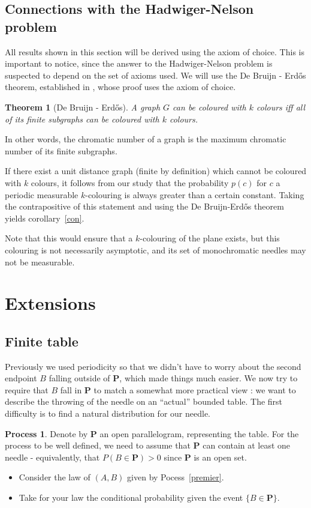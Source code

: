 \documentclass[a4paper,11pt]{article}
\newtheorem{theo}{Theorem}
\theoremstyle{definition}
\newtheorem{process}{Process}
\theoremstyle{remark}
\begin{document}
\subsection{Connections with the Hadwiger-Nelson problem} \label{hn}
All results shown in this section will be derived using the axiom of choice. 
This is important to notice, since the answer to the Hadwiger-Nelson problem is 
suspected to depend on the set of axioms used. We will use the 
De Bruijn - Erd\H{o}s theorem, established in \cite{erdos}, whose proof uses 
the axiom of choice.
\begin{theo}[De Bruijn - Erdős]
 A graph $G$ can be coloured with $k$ colours iff all of its finite subgraphs 
 can be coloured with $k$ colours.
\end{theo}
In other words, the chromatic number of a graph is the maximum chromatic number 
of its finite subgraphs.

If there exist a unit distance graph (finite by definition) which cannot 
be coloured with $k$ colours, it 
follows from our study that the probability $p(c)$ for $c$ a periodic measurable 
$k$-colouring is always greater than a certain constant. Taking the 
contrapositive of this statement and using the De Bruijn-Erdős theorem yields 
corollary~\ref{con}.

Note that this would ensure that a $k$-colouring of the plane exists, but this 
colouring is not necessarily asymptotic, and its set of monochromatic needles 
may not be measurable.

\section{Extensions}
\label{ext}
\subsection{Finite table}
\label{fini}

Previously we used periodicity so that we didn't have to worry about the second 
endpoint $B$ falling outside of $\mathbf{P}$, which made things much easier. We now 
try to require that $B$ fall in $\mathbf{P}$ to match a somewhat more practical 
view : we want to describe the throwing of the needle on an ``actual'' bounded 
table. The first difficulty is to find a natural distribution for our needle.

\begin{process} \label{encore}
Denote by $\mathbf{P}$ an open parallelogram, representing the table. For the 
process to be well defined, we need to assume that $\mathbf{P}$ can contain at
least one needle - equivalently, that $P(B \in \mathbf{P}) > 0$ since $\mathbf{P}$ 
is an open set.
\begin{itemize}
\item Consider the law of $(A,B)$ given by Pocess~\ref{premier}.
\item Take for your law the conditional probability given the event 
$\{B \in \mathbf{P} \}$.
\end{itemize}
\end{process}
\end{document}
